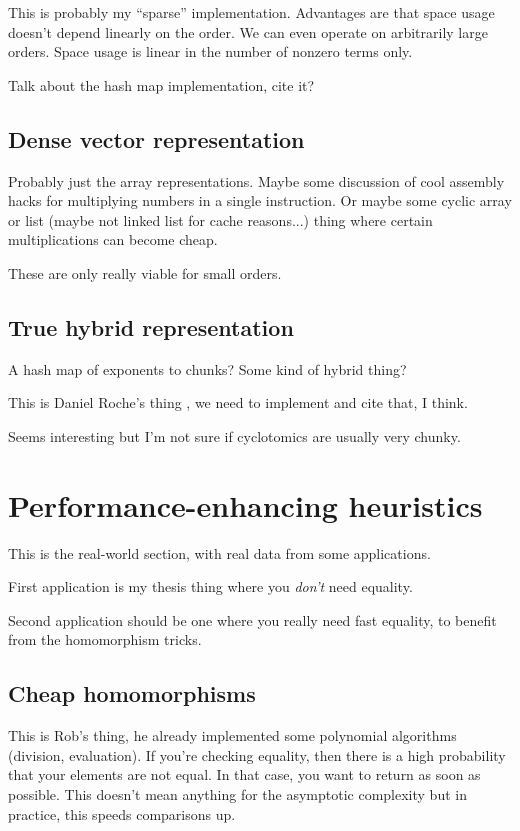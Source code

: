 \documentclass{article}
\begin{document}
This is probably my ``sparse'' implementation. Advantages are that
space usage doesn't depend linearly on the order. We can even operate
on arbitrarily large orders. Space usage is linear in the number of
nonzero terms only.

Talk about the hash map implementation, cite it?

\subsection{Dense vector representation}

Probably just the array representations. Maybe some discussion of cool
assembly hacks for multiplying numbers in a single instruction. Or
maybe some cyclic array or list (maybe not linked list for cache
reasons...) thing where certain multiplications can become cheap.

These are only really viable for small orders.

\subsection{True hybrid representation}

A hash map of exponents to chunks? Some kind of hybrid thing?

This is Daniel Roche's thing \cite{Roche2018}, we need to implement
and cite that, I think.

Seems interesting but I'm not sure if cyclotomics are usually very
chunky.

\section{Performance-enhancing heuristics}

This is the real-world section, with real data from some applications.

First application is my thesis thing where you \emph{don't} need
equality.

Second application should be one where you really need fast equality,
to benefit from the homomorphism tricks.

\subsection{Cheap homomorphisms}

This is Rob's thing, he already implemented some polynomial algorithms
(division, evaluation). If you're checking equality, then there is a
high probability that your elements are not equal. In that case, you
want to return as soon as possible. This doesn't mean anything for the
asymptotic complexity but in practice, this speeds comparisons up.
\end{document}
